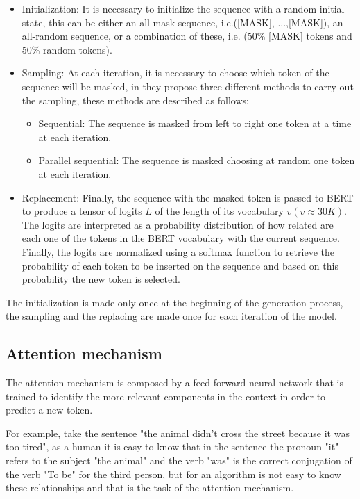 \documentclass[10pt,twocolumn,letterpaper]{article}
\begin{document}
\begin{itemize}
\item Initialization: It is necessary to initialize the sequence with a random initial state, this can be either an all-mask sequence,
i.e.([MASK], ...,[MASK]), an all-random sequence, or a combination of these, i.e. (50\% [MASK] tokens and 50\% random tokens).
\item Sampling: At each iteration, it is necessary to choose which token of the sequence will be masked, in \cite{wang2019bert}
they propose three different methods to carry out the sampling, these methods are described as follows:
\begin{itemize}
   \item Sequential: The sequence is masked from left to right one token at a time at each iteration.
   \item Parallel sequential: The sequence is masked choosing at random one token at each iteration.
\end{itemize}
\item Replacement: Finally, the sequence with the masked token is passed to BERT to produce a tensor of logits $L$ of
the length of its vocabulary $v (v \approx 30K)$. The logits are interpreted as a probability distribution of how related
are each one of the tokens in the BERT vocabulary with the current sequence. Finally, the logits are normalized using a
softmax function to retrieve the probability of each token to be inserted on the sequence and based on this probability
the new token is selected.
\end{itemize}

The initialization is made only once at the beginning of the generation process, the sampling and the replacing are
made once for each iteration of the model.

\subsection{Attention mechanism}
The attention mechanism is composed by a feed forward neural network that is trained to
identify the more relevant components in the context in order to predict a new token.

For example, take the sentence "the animal didn't cross the street because it was too tired",
as a human it is easy to know that in the sentence the pronoun "it" refers to the subject "the animal"
and the verb "was" is the correct conjugation of the verb "To be" for the third person, but for an
algorithm is not easy to know these relationships and that is the task of the attention mechanism.
\end{document}
